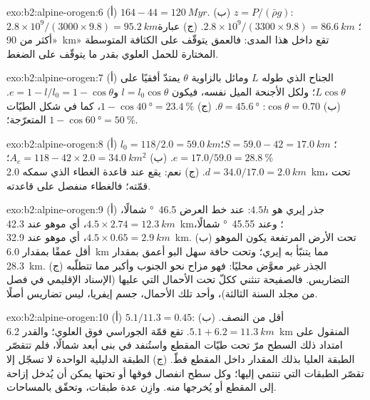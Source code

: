 \begin{solution}{exo:b2:alpine-orogen:6}
(أ) $164 - 44 = \qty{120}{Myr}$. (ب) $z = P/(\bar\rho g)$:
$2.8\times10^9/(3000\times9.8) = \qty{95.2}{km}$؛ $2.8\times10^9/(3300\times9.8) =
\qty{86.6}{km}$. (ج) عبارة «أكثر من \qty{90}{km}» تقع داخل هذا المدى: فالعمق يتوقّف على
الكثافة المتوسطة المختارة للحمل العلوي بقدر ما يتوقّف على الضغط.
\end{solution}

\begin{solution}{exo:b2:alpine-orogen:7}
(أ) الجناح الذي طوله $L$ ومائل بالزاوية $\theta$ يمتدّ أفقيًا على $L\cos\theta$؛ ولكل الأجنحة
الميل نفسه، فيكون $l = l_0\cos\theta$ و$e = 1 - l/l_0 = 1 - \cos\theta$.
(ب) $\cos\theta = 0.70$: $\theta = \qty{45.6}{\degree}$. (ج) $1 - \cos\qty{40}{\degree} =
\qty{23.4}{\percent}$، كما في شكل الطيّات المتعرّجة؛ $1 - \cos\qty{60}{\degree}
= \qty{50}{\percent}$.
\end{solution}

\begin{solution}{exo:b2:alpine-orogen:8}
(أ) $l_0 = 118/2.0 = \qty{59.0}{km}$؛ $S = 59.0 - 42 = \qty{17.0}{km}$؛ $e = 17.0/59.0 =
\qty{28.8}{\percent}$. (ب) $A_e = 118 - 42\times2.0 = \qty{34.0}{km^2}$؛ $d = 34.0/17.0 =
\qty{2.0}{km}$. (ج) نعم: يقع  عند قاعدة الغطاء الذي سمكه \qty{2.0}{km}، تحت
قمّته؛ فالغطاء منفصل على قاعدته.
\end{solution}

\begin{solution}{exo:b2:alpine-orogen:9}
(أ) جذر إيري هو $4.5h$: عند خط العرض \qty{46.5}{\degree} شمالًا، $4.5\times2.74 = \qty{12.3}{km}$، أي
موهو عند \qty{42.3}{km}؛ وعند \qty{45.55}{\degree} شمالًا، $4.5\times0.65 = \qty{2.9}{km}$، أي موهو
عند \qty{32.9}{km}. (ب) تحت الأرض المرتفعة يكون الموهو أقل عمقًا بمقدار \qty{6.0}{km} مما يتنبّأ به
إيري؛ وتحت حافة سهل البو أعمق بمقدار \qty{28.3}{km}. (ج) الجذر غير
معوَّض محليًا: فهو مزاح نحو الجنوب وأكبر مما تتطلّبه التضاريس.
فالصفيحة تنثني ككلّ تحت الأحمال التي عليها (الإسناد الإقليمي في فصل من مجلد السنة
الثالثة)، وأحد تلك الأحمال، جسم إيفريا، ليس تضاريس أصلًا.
\end{solution}

\begin{solution}{exo:b2:alpine-orogen:10}
(أ) $5.1/11.3 = 0.45$: أقل من النصف. (ب) $5.1 + 6.2 = \qty{11.3}{km}$. تقع قمّة
الجوراسي فوق  العلوي؛ والقدر \qty{6.2}{km} المنقول على امتداد ذلك السطح
مرّ تحت طيّات المقطع واستُنفد في بنى أبعد شمالًا، فلم تتقصّر
الطبقة العليا بذلك المقدار داخل المقطع قطّ. (ج) الطبقة الدليلية الواحدة لا تسجّل
إلا تقصّر الطبقات التي تنتمي إليها؛ وكل سطح انفصال فوقها أو تحتها يمكن أن
يُدخل إزاحة إلى المقطع أو يُخرجها منه. وازِن عدة طبقات، وتحقّق بالمساحات.
\end{solution}

